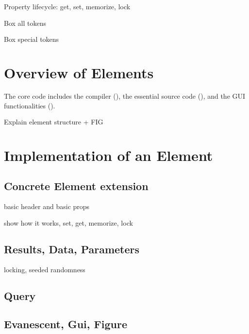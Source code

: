 \documentclass{tufte-handout}
\begin{document}
Property lifecycle: get, set, memorize, lock

Box all tokens 

Box special tokens 

\section{Overview of Elements}

The core code includes the compiler (), the essential source code (), and the GUI functionalities (). 

Explain element structure + FIG

\section{Implementation of an Element}

\subsection{Concrete Element extension}

basic header and basic props

show how it works, set, get, memorize, lock

\subsection{Results, Data, Parameters}

locking, seeded randomness

\subsection{Query}

\subsection{Evanescent, Gui, Figure}

%
%
\end{document}
